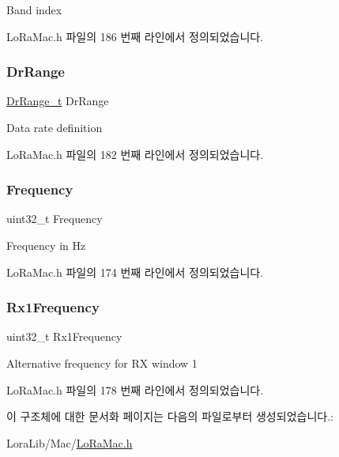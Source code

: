Band index 

Lo\+Ra\+Mac.\+h 파일의 186 번째 라인에서 정의되었습니다.

\mbox{\label{structs_channel_params_ad4d9b041ea740886a05fa8a1d06997a2}} 
\subsubsection{\texorpdfstring{Dr\+Range}{DrRange}}
{\footnotesize\ttfamily \mbox{\hyperlink{group___l_o_r_a_m_a_c_ga8b818a36013d6bdd83ac5fd20f42b503}{Dr\+Range\+\_\+t}} Dr\+Range}

Data rate definition 

Lo\+Ra\+Mac.\+h 파일의 182 번째 라인에서 정의되었습니다.

\mbox{\label{structs_channel_params_ade3d190636488dad9a89b19446b7acf1}} 
\subsubsection{\texorpdfstring{Frequency}{Frequency}}
{\footnotesize\ttfamily uint32\+\_\+t Frequency}

Frequency in Hz 

Lo\+Ra\+Mac.\+h 파일의 174 번째 라인에서 정의되었습니다.

\mbox{\label{structs_channel_params_a8a564b8635b12d5f0f348ae177dd92e1}} 
\subsubsection{\texorpdfstring{Rx1\+Frequency}{Rx1Frequency}}
{\footnotesize\ttfamily uint32\+\_\+t Rx1\+Frequency}

Alternative frequency for RX window 1 

Lo\+Ra\+Mac.\+h 파일의 178 번째 라인에서 정의되었습니다.



이 구조체에 대한 문서화 페이지는 다음의 파일로부터 생성되었습니다.\+:\begin{DoxyCompactItemize}
\item 
Lora\+Lib/\+Mac/\mbox{\hyperlink{_lo_ra_mac_8h}{Lo\+Ra\+Mac.\+h}}\end{DoxyCompactItemize}
